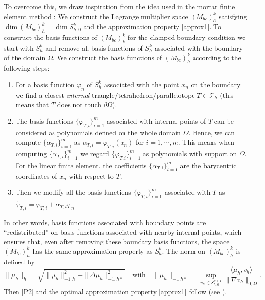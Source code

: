 \documentclass[a4paper,final]{siamltex}
\newcommand{\CT}{\mathcal{T}}
\newcommand{\Mb}{{(M_{bc})}}
\begin{document}
\begin{itemize}
To overcome this, we draw inspiration from the idea used in the mortar
finite element method \cite{LSW05,Lam06}: We construct the Lagrange multiplier
space $\Mb^k_h$ satisfying $\dim \Mb^k_h = \dim S^k_{h,0}$ and the
approximation property \eqref{approx1}.  To construct the basis functions of
$\Mb_h^k$ for the clamped boundary condition we start with $S_h^k$ and remove
all basis functions of $S_h^k$ associated with the boundary of the domain
$\Omega$.  We construct the basis functions of $\Mb^k_h$ according to the following
steps:
\begin{enumerate}
\item For a basis function $\varphi_n$  of $S_h^k$ associated with the point $x_n$ 
on the boundary we find a closest \emph{internal} triangle/tetrahedron/parallelotope $T \in \CT_h$
(this means that $T$ does not touch $\partial\Omega$).
\item The basis functions $\{\varphi_{T, i}\}_{i=1}^m$ associated with internal points of
$T$ can be considered as polynomials defined on the whole domain $\Omega$. Hence, we can compute
$\{\alpha_{T,i} \}_{i=1}^m$  as $\alpha_{T,i}  = \varphi_{T, i}(x_n)$ for $i=1,\cdots,m.$
{This means when computing $\{\alpha_{T,i} \}_{i=1}^m$ 
we regard $  \{\varphi_{T, i}\}_{i=1}^m$ as polynomials with support on $\overline{\Omega}$.}
 For the linear finite element, the coefficients $\{\alpha_{T,i} \}_{i=1}^m$ are the barycentric coordinates 
 of $x_n$ with respect to $T$. 
\item Then we modify all the basis functions  $\{\varphi_{T,i}\}_{i=1}^m$ associated
with $T$ as $ \tilde \varphi_{T,i}= \varphi_{T,i} + \alpha_{T,i} \varphi_n$.
\end{enumerate}
In other words, basis functions associated with boundary points are ``redistributed'' on
basis functions associated with nearby internal points, which ensures that, even after removing
these boundary basis functions, the space $\Mb^k_h$ has the same approximation property
as $S_h^k$.
The norm on $\Mb_h^k$ is defined by
\[ \|\mu_h\|_{h} = \sqrt{\|\mu_h\|_{-1,h}^2+ \|\Delta \mu_h\|_{-1,h*}^2}\quad\text{with}\quad
\|\mu_h\|_{-1,h*}= \sup_{v_h \in S^{k+1}_{h,0}} \frac{\langle \mu_h,v_h\rangle}{\|\nabla {v_h}\|_{0,\Omega}}.\]
Then [P2] and the optimal
approximation property \eqref{approx1} follow (see \cite{Lam06,LSW05}).
\end{itemize}
~\\
\end{document}
